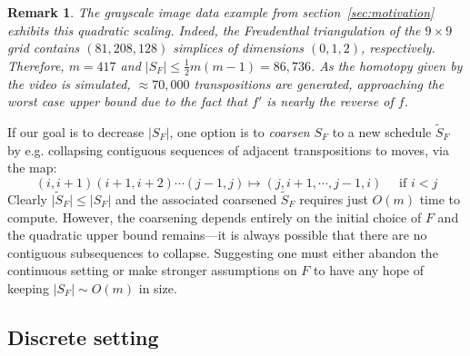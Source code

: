 \documentclass[sn-mathphys]{sn-jnl}
\newtheorem{remark}{Remark}
\begin{document}
\begin{remark}
	The grayscale image data example from section~\ref{sec:motivation} exhibits this quadratic scaling.
Indeed, the Freudenthal triangulation of the $9\times 9$ grid contains $(81, 208, 128)$ simplices of dimensions $(0, 1, 2)$, respectively. 
Therefore, $m = 417$ and $\lvert S_F \rvert \leq \frac{1}{2}m(m-1) = 86,736$.
As the homotopy given by the video is simulated,  $\approx 70,\!000$ transpositions are generated, approaching the worst case upper bound due to the fact that $f'$  is nearly the reverse of $f$.  
\end{remark}

If our goal is to decrease  $\lvert S_F \rvert$, one option is to \emph{coarsen} $S_F$ to a new schedule $\widetilde{S}_F$ by e.g. collapsing contiguous sequences of adjacent transpositions to moves, via the map:
\begin{equation}\label{eq:tr_to_mv}
	 (i, i+1)(i+1, i+2)\cdots(j-1, j) \mapsto (j, i+1, \cdots, j-1, i)  \quad \text{ if } i < j
\end{equation}
Clearly $\lvert \widetilde{S}_F \rvert \leq \lvert S_F \rvert$ and the associated coarsened $\widetilde{S}_F$ requires just $O(m)$ time to compute. However, the coarsening depends entirely on the initial choice of $F$ and the quadratic upper bound remains---it is always possible that there are no contiguous subsequences to collapse. 
Suggesting one must either abandon the continuous  setting or make stronger assumptions on $F$ to have any hope of keeping $\lvert S_F \rvert \sim O(m)$ in size.

\subsection{Discrete setting}\label{sec:moves_setting}
\end{document}
